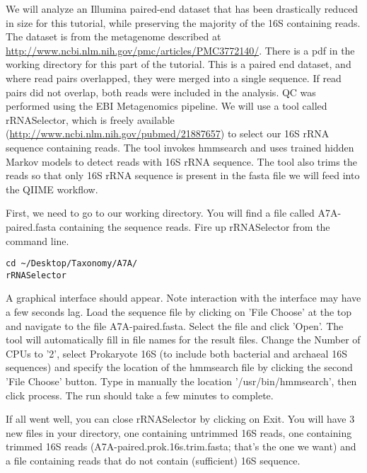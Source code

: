 We will analyze an Illumina paired-end dataset that has been drastically reduced in size for this tutorial, while preserving the majority of the 16S containing reads. The dataset is from the metagenome described at \url{http://www.ncbi.nlm.nih.gov/pmc/articles/PMC3772140/}. There is a pdf in the working directory for this part of the tutorial. This is a paired end dataset, and where read pairs overlapped, they were merged into a single sequence. If read pairs did not overlap, both reads were included in the analysis. QC was performed using the EBI Metagenomics pipeline.
We will use a tool called rRNASelector, which is freely available (\url{http://www.ncbi.nlm.nih.gov/pubmed/21887657}) to select our 16S rRNA sequence containing reads.  The tool invokes hmmsearch and uses trained hidden Markov models to detect reads with 16S rRNA sequence. The tool also trims the reads so that only 16S rRNA sequence is present in the fasta file we will feed into the QIIME workflow.

\begin{steps}
First, we need to go to our working directory.
You will find a file called A7A-paired.fasta containing the sequence reads.
Fire up rRNASelector from the command line.

\begin{lstlisting}
cd ~/Desktop/Taxonomy/A7A/
rRNASelector
\end{lstlisting}
\end{steps}

A graphical interface should appear. Note interaction with the interface may have a few seconds lag. Load the sequence file by clicking on 'File Choose' at the top and navigate to the file A7A-paired.fasta. Select the file and click 'Open'. The tool will automatically fill in file names for the result files. Change the Number of CPUs to '2', select Prokaryote 16S (to include both bacterial and archaeal 16S sequences) and specify the location of the hmmsearch file by clicking the second 'File Choose' button. Type in manually the location '/usr/bin/hmmsearch', then click process. The run should take a few minutes to complete.

If all went well, you can close rRNASelector by clicking on Exit. You will have 3 new files in your directory, one containing untrimmed 16S reads, one containing trimmed 16S reads (A7A-paired.prok.16s.trim.fasta; that's the one we want) and a file containing reads that do not contain (sufficient) 16S sequence.


